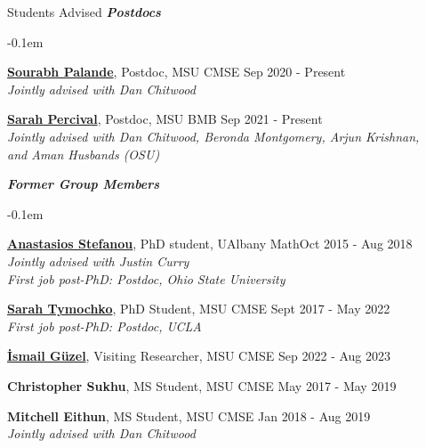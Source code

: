 \documentclass{resume} %
\begin{document}
\begin{rSection}{Students Advised}
\textbf{\textit{Postdocs}}
\begin{list}{}{\leftmargin=1em}
   \itemsep -0.1em %


   \item \textbf{\href{http://sci.utah.edu/~sourabh/}{Sourabh Palande}}, Postdoc, MSU CMSE \hfill Sep 2020 - Present\\
   \phantom{XXX} \textit{Jointly advised with Dan Chitwood}

   \item \textbf{\href{https://sperciva.github.io/}{Sarah Percival}}, Postdoc, MSU BMB \hfill Sep 2021 - Present\\
   \phantom{XXX} \textit{Jointly advised with Dan Chitwood, Beronda Montgomery, Arjun Krishnan,}\\
   \phantom{XXX} \textit{and Aman Husbands (OSU)}


\end{list}

\textbf{\textit{Former Group Members}}
\begin{list}{}{\leftmargin=1em}
   \itemsep -0.1em %


   \item \textbf{\href{https://sites.google.com/view/anastasiostefanou/home}{Anastasios Stefanou}}, PhD student, UAlbany Math\hfill Oct 2015 - Aug 2018
\\
   \phantom{XXX} \textit{Jointly advised with Justin Curry}
\\
   \phantom{XXX} \textit{First job post-PhD: Postdoc, Ohio State University}


   \item \textbf{\href{https://www.sarahtymochko.com/}{Sarah Tymochko}}, PhD Student, MSU CMSE \hfill Sept 2017 - May 2022
\\
   \phantom{XXX} \textit{First job post-PhD: Postdoc, UCLA}


   \item \textbf{\href{https://ismailguzel.github.io/}{\.{I}smail G\"{u}zel}}, Visiting Researcher, MSU CMSE \hfill Sep 2022 - Aug 2023

   \item \textbf{Christopher Sukhu}, MS Student, MSU CMSE \hfill May 2017 - May 2019

   \item \textbf{Mitchell Eithun}, MS Student, MSU CMSE \hfill Jan 2018 - Aug 2019
\\
   \phantom{XXX} \textit{Jointly advised with Dan Chitwood}





\end{list}
\end{rSection}
\end{document}
